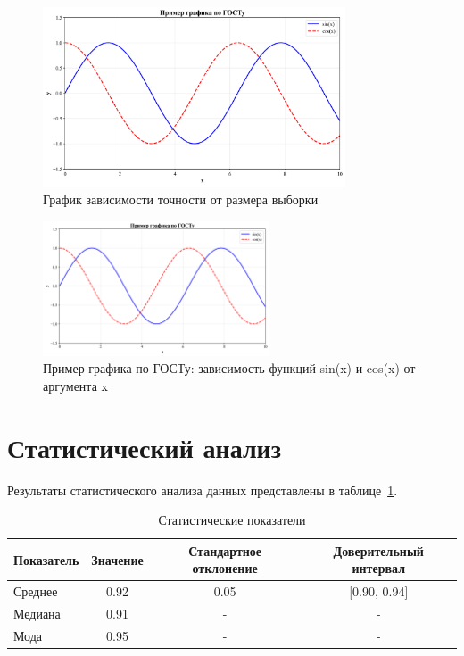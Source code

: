 \begin{figure}[H]
\centering
\includegraphics[width=0.8\textwidth]{images/example_plot.png}
\caption{График зависимости точности от размера выборки}
\label{fig:accuracy_plot}
\end{figure}

\begin{figure}[H]
\centering
\includegraphics[width=0.6\textwidth]{images/example_plot.png}
\caption{Пример графика по ГОСТу: зависимость функций sin(x) и cos(x) от аргумента x}
\label{fig:gost_example}
\end{figure}

\section{Статистический анализ}

Результаты статистического анализа данных представлены в таблице~\ref{tab:statistics}.

\begin{table}[H]
\centering
\caption{Статистические показатели}
\begin{tabular}{|l|c|c|c|}
\hline
Показатель & Значение & Стандартное отклонение & Доверительный интервал \\
\hline
Среднее & 0.92 & 0.05 & [0.90, 0.94] \\
Медиана & 0.91 & - & - \\
Мода & 0.95 & - & - \\
\hline
\end{tabular}
\label{tab:statistics}
\end{table}
